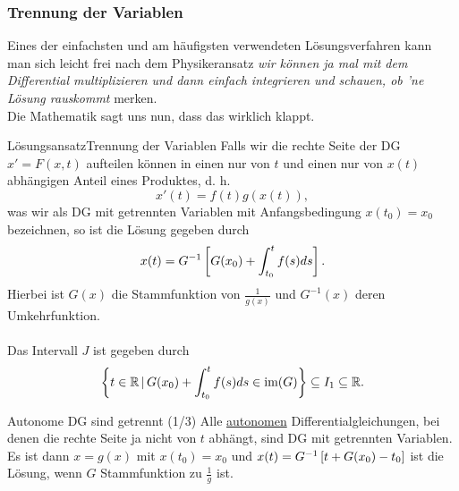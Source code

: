 \subsubsection{Trennung der Variablen}
Eines der einfachsten und am häufigsten verwendeten Lösungsverfahren kann man sich leicht frei nach dem Physikeransatz \textit{wir können ja mal mit dem Differential multiplizieren und dann einfach  integrieren und schauen, ob 'ne Lösung rauskommt} merken.\\
Die Mathematik sagt uns nun, dass das wirklich klappt.\\
\begin{Satz}
{Lösungsansatz}{Trennung der Variablen}
Falls wir die rechte Seite der DG $x'=F(x,t)$ aufteilen können in einen nur von $t$ und einen nur von $x(t)$ abhängigen Anteil eines Produktes, d. h.
\begin{equation*}
    x'(t)=f(t)g(x(t)),
\end{equation*}
was wir als DG mit getrennten Variablen mit Anfangsbedingung $x(t_0)=x_0$ bezeichnen, so ist die Lösung gegeben durch
\begin{equation*}
    x(t)=G^{-1}\left[{G(x_0)+\int_{t_0}^tf(s)ds}\right].
\end{equation*}
Hierbei ist $G(x)$ die Stammfunktion von $\frac{1}{g(x)}$ und $G^{-1}(x)$ deren Umkehrfunktion.\\
\\
Das Intervall $J$ ist gegeben durch
\begin{equation*}
    \left\{t\in\mathbb{R}\,|\, G(x_0)+\int_{t_0}^tf(s)ds\in\text{im}(G)\right\}\subseteq I_1\subseteq \mathbb{R}.
\end{equation*}
\end{Satz}
\begin{Beispiel}
{Autonome DG sind getrennt (1/3)}
Alle \underline{autonomen} Differentialgleichungen, bei denen die rechte Seite ja nicht von $t$ abhängt, sind DG mit getrennten Variablen.\\
Es ist dann $x=g(x)$ mit $x(t_0)=x_0$ und $x(t)=G^{-1}\left[{t+G(x_0)-t_0}\right]$ ist die Lösung, wenn $G$ Stammfunktion zu $\frac{1}{g}$ ist.
\end{Beispiel}
